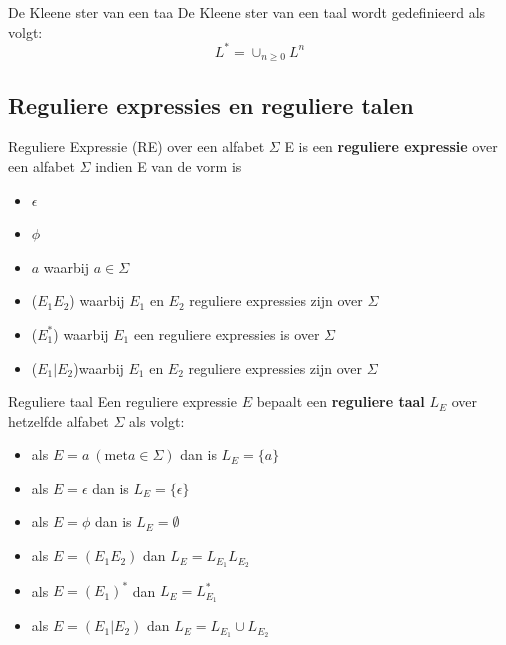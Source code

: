 \begin{pro}{De Kleene ster van een taa}
    De Kleene ster van een taal wordt gedefinieerd als volgt:
    \begin{equation*}
        L^* = \cup_{n \geq 0}L^n
    \end{equation*}
    \vspace{-0.5cm}
\end{pro}

\newpage

\subsection{Reguliere expressies en reguliere talen}

\vspace{0.5cm}

\begin{theo}{Reguliere Expressie (RE) over een alfabet $\Sigma$}
    E is een \textbf{reguliere expressie} over een alfabet $\Sigma$ indien E van de vorm is
    \begin{itemize}
        \item $\epsilon$
        \item $\phi$
        \item $a$ waarbij $a \in \Sigma$
        \item ($E_{1}E_{2}$) waarbij $E_1$ en $E_2$ reguliere expressies zijn over $\Sigma$
        \item ($E_{1}^*$) waarbij $E_1$ een reguliere expressies is over $\Sigma$
        \item ($E_{1}|E_{2}$)waarbij $E_1$ en $E_2$ reguliere expressies zijn over $\Sigma$
    \end{itemize}
    \vspace{-0.3cm}
\end{theo}

\begin{theo}{Reguliere taal}
    Een reguliere expressie $E$ bepaalt een \textbf{reguliere taal} $L_E$ over hetzelfde alfabet $\Sigma$ als volgt:
    \begin{itemize}
        \item als $E = a \ (\text{met} a \in \Sigma)$ dan is $L_E = \{a\}$
        \item als $E = \epsilon$ dan is $L_E = \{\epsilon\}$
        \item als $E = \phi$ dan is $L_E = \emptyset$
        \item als $E = (E_{1}E_{2})$ dan $L_E = L_{E_1}L_{E_2}$
        \item als $E = (E_{1})^*$ dan $L_E = L_{E_1}^*$
        \item als $E = (E_{1}|E_{2})$ dan $L_E = L_{E_1} \cup L_{E_2}$
    \end{itemize}
    \vspace{-0.3cm}
\end{theo}

